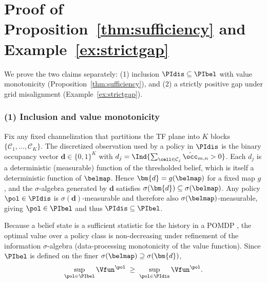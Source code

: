 \section{Proof of Proposition~\ref{thm:sufficiency} and Example~\ref{ex:strictgap}}
\label{sec:appendix_suff}

We prove the two claims separately: (1) inclusion
$\PIdis\subseteq\PIbel$ with value monotonicity
(Proposition~\ref{thm:sufficiency}), and (2) a strictly positive
gap under grid misalignment (Example~\ref{ex:strictgap}).

\subsubsection*{(1) Inclusion and value monotonicity}
Fix any fixed channelization that partitions the TF plane into $K$ blocks
$\{\mathcal{C}_1,\dots,\mathcal{C}_K\}$. The discretized observation used by a
policy in $\PIdis$ is the binary occupancy vector
$\bm{d}\in\{0,1\}^{K}$ with $d_j=\Ind\{\sum_{\cell\in\mathcal{C}_j}
\hat{\occ}_{m,n}>0\}$. Each $d_j$ is a deterministic (measurable) function of
the thresholded belief, which is itself a deterministic function of
$\belmap$. Hence $\bm{d}=g(\belmap)$ for a fixed map $g$, and the
$\sigma$-algebra generated by $\bm{d}$ satisfies
$\sigma(\bm{d})\subseteq\sigma(\belmap)$. Any policy
$\pol\in\PIdis$ is $\sigma(\bm{d})$-measurable and therefore also
$\sigma(\belmap)$-measurable, giving $\pol\in\PIbel$ and thus
$\PIdis\subseteq\PIbel$.

Because a belief state is a sufficient statistic for the history in a POMDP
\cite{kaelbling1998planning}, the optimal value over a policy class is
non-decreasing under refinement of the information $\sigma$-algebra
(data-processing monotonicity of the value function). Since $\PIbel$ is
defined on the finer $\sigma(\belmap)\supseteq\sigma(\bm{d})$,
\begin{equation}
\sup_{\pol\in\PIbel}\Vfun^{\pol}
\;\ge\;
\sup_{\pol\in\PIdis}\Vfun^{\pol}.
\label{eq:appB_monotone}
\end{equation}

